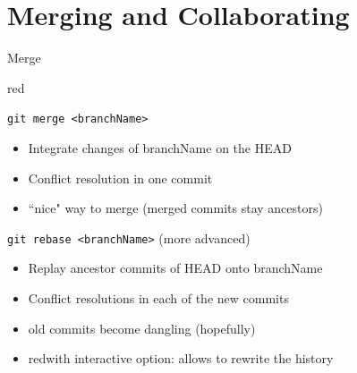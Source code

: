 \documentclass{beamer}
\begin{document}
\section{Merging and Collaborating}
\begin{frame}{Merge}
\begin{center}
\begin{color}{red}
\end{color}
\end{center}
\begin{block}{\texttt{git~merge <branchName>}}
\begin{itemize}
\item Integrate changes of branchName on the HEAD
\item Conflict resolution in one commit
\item ``nice" way to merge (merged commits stay ancestors)
\end{itemize}
\end{block}\pause
\begin{block}{ \texttt{git~rebase <branchName>} (more advanced) }
\begin{itemize}
\item Replay ancestor commits of HEAD onto branchName
\item Conflict resolutions in each of the new commits
\item old commits become dangling (hopefully)
\item \begin{color}{red}with interactive option: allows to rewrite the history\end{color}
\end{itemize}
\end{block}
\end{frame}
\end{document}
